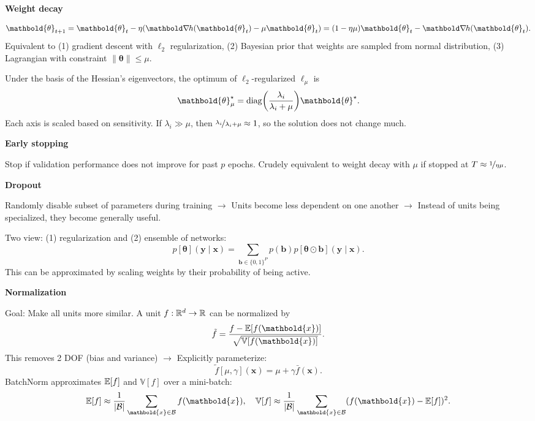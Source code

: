 \documentclass[10pt]{article}
\newenvironment{topic}[1]
{\textbf{\sffamily \footnotesize \colorbox{black}{\rlap{\textbf{\textcolor{white}{#1}}}\hspace{\linewidth}\hspace{-2\fboxsep}}}}
{}
\newenvironment{subtopic}[1]
{\vspace{0.1cm} \begin{center}\textbf{\footnotesize \sffamily #1}\end{center}}
{}
\renewcommand{\vec}[1]{\ensuremath{\mathbold{#1}}}
\renewcommand{\Var}{\mathbb{V}}
\begin{document}
\begin{multicols*}{3}
\begin{topic}{Tricks of the trade}
        \begin{subtopic}{Weight decay}
            \[
                \vec{\theta}_{t+1} = \vec{\theta}_t - \eta (\grad{h(\vec{\theta}_t)}{} - \mu \vec{\theta}_t) = (1-\eta \mu) \vec{\theta}_t - \grad{h(\vec{\theta}_t)}{}.
            \]
            Equivalent to (1) gradient descent with $\ell_2$ regularization, (2) Bayesian prior that weights
            are sampled from normal distribution, (3) Lagrangian with constraint $\| \vec{\theta} \| \leq \mu$.

            Under the basis of the Hessian's eigenvectors, the optimum of $\ell_2$-regularized $\ell_{\mu}$ is \[
                \vec{\theta}_\mu^\star = \mathrm{diag}\lft( \frac{\lambda_i}{\lambda_i + \mu} \rgt) \vec{\theta}^\star.
            \]
            Each axis is scaled based on sensitivity. If $\lambda_i \gg \mu$, then
            $\nicefrac{\lambda_i}{\lambda_i + \mu} \approx 1$, so the solution does not change much.
        \end{subtopic}

        \begin{subtopic}{Early stopping}
            Stop if validation performance does not improve for past $p$ epochs. Crudely
            equivalent to weight decay with $\mu$ if stopped at $T \approx \nicefrac{1}{\eta \mu}$.
        \end{subtopic}

        \begin{subtopic}{Dropout}
            Randomly disable subset of parameters during training $\to$ Units become less dependent
            on one another $\to$ Instead of units being specialized, they become generally useful.

            Two view: (1) regularization and (2) ensemble of networks: \[
                p[\vec{\theta}](\vec{y} \mid \vec{x}) = \sum_{\vec{b} \in \{ 0,1 \}^P} p(\vec{b}) p[\vec{\theta} \odot \vec{b}](\vec{y} \mid \vec{x}).
            \]
            This can be approximated by scaling weights by their probability of being active.
        \end{subtopic}

        \begin{subtopic}{Normalization}
            Goal: Make all units more similar. A unit $f: \mathbb{R}^d \to \mathbb{R}$ can be normalized by \[
                \tilde{f} = \frac{f - \E[f(\vec{x})]}{\sqrt{\Var[f(\vec{x})]}}.
            \]
            This removes 2 DOF (bias and variance) $\to$ Explicitly parameterize: \[
                \tilde{f}[\mu,\gamma](\vec{x}) = \mu + \gamma \bar{f}(\vec{x}).
            \]
            BatchNorm approximates $\mathbb{E}[f]$ and $\Var[f]$ over a mini-batch: \[
                \E[f] \approx \frac{1}{|\mathcal{B}|} \sum_{\vec{x} \in \mathcal{B}} f(\vec{x}), \quad \Var[f] \approx \frac{1}{|\mathcal{B}|} \sum_{\vec{x} \in \mathcal{B}} (f(\vec{x}) - \E[f])^2.
            \]


\end{subtopic}
\end{topic}
\end{multicols*}
\end{document}
